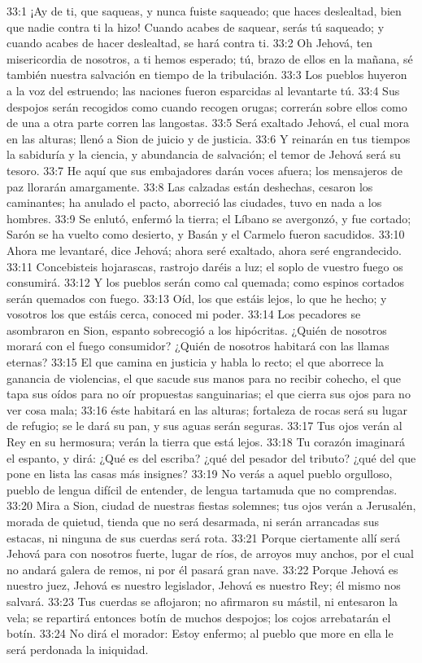 33:1 ¡Ay de ti, que saqueas, y nunca fuiste saqueado; que haces deslealtad, bien que nadie contra ti la hizo! Cuando acabes de saquear, serás tú saqueado; y cuando acabes de hacer deslealtad, se hará contra ti. 
33:2 Oh Jehová, ten misericordia de nosotros, a ti hemos esperado; tú, brazo de ellos en la mañana, sé también nuestra salvación en tiempo de la tribulación. 
33:3 Los pueblos huyeron a la voz del estruendo; las naciones fueron esparcidas al levantarte tú. 
33:4 Sus despojos serán recogidos como cuando recogen orugas; correrán sobre ellos como de una a otra parte corren las langostas. 
33:5 Será exaltado Jehová, el cual mora en las alturas; llenó a Sion de juicio y de justicia. 
33:6 Y reinarán en tus tiempos la sabiduría y la ciencia, y abundancia de salvación; el temor de Jehová será su tesoro. 
33:7 He aquí que sus embajadores darán voces afuera; los mensajeros de paz llorarán amargamente. 
33:8 Las calzadas están deshechas, cesaron los caminantes; ha anulado el pacto, aborreció las ciudades, tuvo en nada a los hombres. 
33:9 Se enlutó, enfermó la tierra; el Líbano se avergonzó, y fue cortado; Sarón se ha vuelto como desierto, y Basán y el Carmelo fueron sacudidos. 
33:10 Ahora me levantaré, dice Jehová; ahora seré exaltado, ahora seré engrandecido. 
33:11 Concebisteis hojarascas, rastrojo daréis a luz; el soplo de vuestro fuego os consumirá. 
33:12 Y los pueblos serán como cal quemada; como espinos cortados serán quemados con fuego. 
33:13 Oíd, los que estáis lejos, lo que he hecho; y vosotros los que estáis cerca, conoced mi poder. 
33:14 Los pecadores se asombraron en Sion, espanto sobrecogió a los hipócritas. ¿Quién de nosotros morará con el fuego consumidor? ¿Quién de nosotros habitará con las llamas eternas? 
33:15 El que camina en justicia y habla lo recto; el que aborrece la ganancia de violencias, el que sacude sus manos para no recibir cohecho, el que tapa sus oídos para no oír propuestas sanguinarias; el que cierra sus ojos para no ver cosa mala; 
33:16 éste habitará en las alturas; fortaleza de rocas será su lugar de refugio; se le dará su pan, y sus aguas serán seguras. 
33:17 Tus ojos verán al Rey en su hermosura; verán la tierra que está lejos. 
33:18 Tu corazón imaginará el espanto, y dirá: ¿Qué es del escriba? ¿qué del pesador del tributo? ¿qué del que pone en lista las casas más insignes? 
33:19 No verás a aquel pueblo orgulloso, pueblo de lengua difícil de entender, de lengua tartamuda que no comprendas. 
33:20 Mira a Sion, ciudad de nuestras fiestas solemnes; tus ojos verán a Jerusalén, morada de quietud, tienda que no será desarmada, ni serán arrancadas sus estacas, ni ninguna de sus cuerdas será rota. 
33:21 Porque ciertamente allí será Jehová para con nosotros fuerte, lugar de ríos, de arroyos muy anchos, por el cual no andará galera de remos, ni por él pasará gran nave. 
33:22 Porque Jehová es nuestro juez, Jehová es nuestro legislador, Jehová es nuestro Rey; él mismo nos salvará. 
33:23 Tus cuerdas se aflojaron; no afirmaron su mástil, ni entesaron la vela; se repartirá entonces botín de muchos despojos; los cojos arrebatarán el botín. 
33:24 No dirá el morador: Estoy enfermo; al pueblo que more en ella le será perdonada la iniquidad. 

